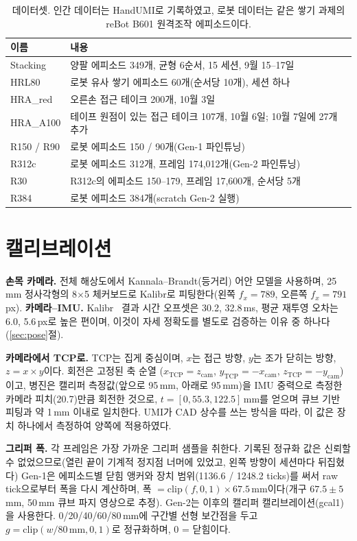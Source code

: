 \documentclass[conference,10pt]{IEEEtran}
\newcommand{\mm}{\,mm\xspace}
\begin{document}
\begin{table}[t]
\centering\footnotesize\setlength{\tabcolsep}{3pt}
\caption{데이터셋. 인간 데이터는 HandUMI로 기록하였고, 로봇 데이터는 같은 쌓기 과제의 reBot B601 원격조작 에피소드이다.}
\label{tab:data}
\begin{tabular}{@{}lp{56mm}@{}}
\toprule
이름 & 내용 \\
\midrule
Stacking & 양팔 에피소드 349개, 균형 6순서, 15 세션, 9월 15--17일 \\
HRL80 & 로봇 유사 쌓기 에피소드 60개(순서당 10개), 세션 하나 \\
HRA\_red & 오른손 접근 테이크 200개, 10월 3일 \\
HRA\_A100 & 테이프 원점이 있는 접근 테이크 107개, 10월 6일; 10월 7일에 27개 추가 \\
\midrule
R150 / R90 & 로봇 에피소드 150 / 90개(Gen-1 파인튜닝) \\
R312c & 로봇 에피소드 312개, 프레임 174{,}012개(Gen-2 파인튜닝) \\
R30 & R312c의 에피소드 150--179, 프레임 17{,}600개, 순서당 5개 \\
R384 & 로봇 에피소드 384개(scratch Gen-2 실행) \\
\bottomrule
\end{tabular}
\end{table}

\section{캘리브레이션}\label{sec:cal}
\textbf{손목 카메라.} 전체 해상도에서 Kannala--Brandt(등거리) 어안 모델을 사용하며, 25\mm{} 정사각형의 8$\times$5 체커보드로 Kalibr로
피팅한다(왼쪽 $f_x{=}789$, 오른쪽 $f_x{=}791$\,px). \textbf{카메라--IMU.} Kalibr~\cite{furgale2013kalibr} 결과 시간 오프셋은 30.2,
32.8\,ms, 평균 재투영 오차는 6.0, 5.6\,px로 높은 편이며, 이것이 자세 정확도를 별도로 검증하는 이유 중 하나다(\ref{sec:pose}절).

\textbf{카메라에서 TCP로.} TCP는 집게 중심이며, $x$는 접근 방향, $y$는 조가 닫히는 방향, $z=x\times y$이다. 회전은 고정된 축 순열
($x_\text{TCP}=z_\text{cam}$, $y_\text{TCP}=-x_\text{cam}$, $z_\text{TCP}=-y_\text{cam}$)이고, 병진은 캘리퍼 측정값(앞으로 95\mm, 아래로
95\mm)을 IMU 중력으로 측정한 카메라 피치(20.7\textdegree)만큼 회전한 것으로, $t=[0, 55.3, 122.5]$\mm{}를 얻으며 큐브 기반 피팅과 약
1\mm{} 이내로 일치한다. UMI가 CAD 상수를 쓰는 방식을 따라, 이 값은 장치 하나에서 측정하여 양쪽에 적용하였다.

\textbf{그리퍼 폭.} 각 프레임은 가장 가까운 그리퍼 샘플을 취한다. 기록된 정규화 값은 신뢰할 수 없었으므로(열린 끝이 기계적 정지점
너머에 있었고, 왼쪽 방향이 세션마다 뒤집혔다) Gen-1은 에피소드별 닫힘 앵커와 장치 범위(1136.6 / 1248.2 ticks)를 써서 raw tick으로부터
폭을 다시 계산하며, 폭 $=\mathrm{clip}(f,0,1)\times 67.5$\mm{}이다(개구 $67.5\pm5$\mm, 50\mm{} 큐브 파지 영상으로 추정). Gen-2는 이후의
캘리퍼 캘리브레이션(gcal1)을 사용한다. 0/20/40/60/80\mm{}에 구간별 선형 보간점을 두고 $g=\mathrm{clip}(w/80\,\text{mm},0,1)$로
정규화하며, 0 = 닫힘이다.
\end{document}
